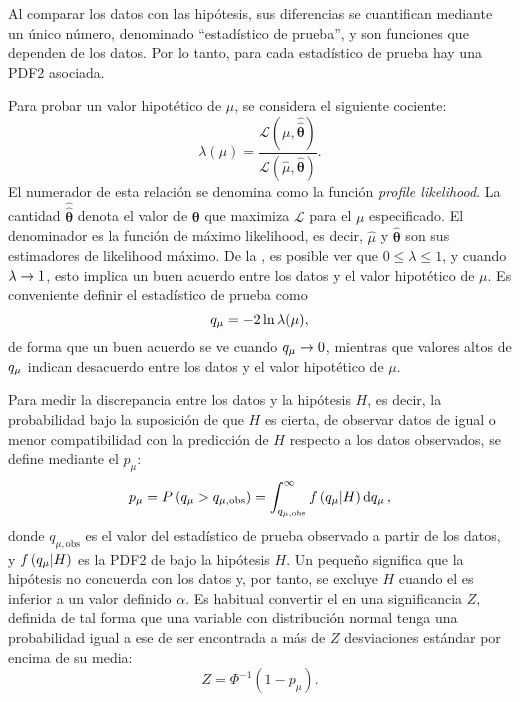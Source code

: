 Al comparar los datos con las hipótesis, sus diferencias se cuantifican mediante un único número, denominado \enquote{estad\'istico de prueba}, y son funciones que dependen de los datos. Por lo tanto, para cada estadístico de prueba hay una \ac{PDF2} asociada.

Para probar un valor hipotético de \(\mu\), se considera el siguiente cociente:
\begin{equation}
    \label{eq:strategy:stat_treatment:hypo_test:lambdamu}
    \lambda(\mu) = \frac{
        \mathcal{L} \left(\mu, \hat{\hat{\bm{\theta}}}\right)
    }{
        \mathcal{L} \left(\hat{\mu}, \hat{\bm{\theta}}\right)
    }.
\end{equation}
El numerador de esta relación se denomina como la funci\'on \textit{profile likelihood}. La cantidad \(\hat{\hat{\bm{\theta}}}\) denota el valor de \(\bm{\theta}\) que maximiza \(\mathcal{L}\) para el \(\mu\) especificado. El denominador es la función de máximo likelihood, es decir, \(\hat{\mu}\) y \(\hat{\bm{\theta}}\) son sus estimadores de likelihood máximo.
De la \Eqn{\ref{eq:strategy:stat_treatment:hypo_test:lambdamu}}, es posible ver que \(0 \leq \lambda \leq 1\), y cuando \(\lambda \rightarrow 1\), esto implica un buen acuerdo entre los datos y el valor hipotético de \(\mu\).
Es conveniente definir el estadístico de prueba \qmu como
\begin{equation}
    \label{eq:strategy:stat_treatment:hypo_test:qmu}
    q_{\mu}  = - 2 \ln \lambda(\mu),
\end{equation}
de forma que un buen acuerdo se ve cuando \(q_{\mu} \rightarrow 0\), mientras que valores altos de \(q_{\mu}\) indican desacuerdo entre los datos y el valor hipotético de \(\mu\).


Para medir la discrepancia entre los datos y la hipótesis \(H\), es decir, la probabilidad bajo la suposici\'on de que \(H\) es cierta, de observar datos de igual o menor compatibilidad con la predicci\'on de \(H\) respecto a los datos observados, se define mediante el \pval \(p_{\mu}\):
\begin{equation}
    p_{\mu} = P \left( q_{\mu} > q_{\mu, \text{obs}} \right) = \int_{q_{\mu, \text{obs}}}^{\infty} f \left(q_{\mu} | H\right) \dd{\ensuremath{q_{\mu}}},
\end{equation}
donde \(q_{\mu, \text{obs}}\) es el valor del estadístico de prueba observado a partir de los datos, y \(f\left(q_{\mu} | H\right)\) es la \ac{PDF2} de \qmu bajo la hipótesis \(H\). Un \pval pequeño significa que la hipótesis no concuerda con los datos y, por tanto, se excluye \(H\) cuando el \pval es inferior a un valor definido \(\alpha\).
Es habitual convertir el \pval en una significancia \(Z\), definida de tal forma que una variable con distribución normal tenga una probabilidad igual a ese \pval de ser encontrada a m\'as de \(Z\) desviaciones est\'andar por encima de su media:
\begin{equation}
    Z = \Phi^{-1} \left(1 - p_{\mu}\right).
\end{equation}

